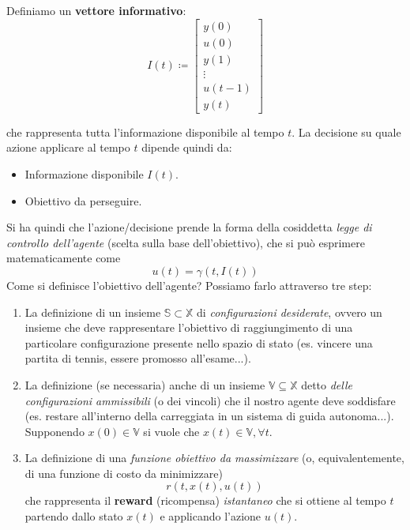 Definiamo un \textbf{vettore informativo}: 
\begin{equation}
    I(t) \coloneqq \begin{bmatrix}
y(0) \\
u(0) \\
y(1) \\
\vdots \\
u(t-1) \\
y(t)
\end{bmatrix}
\end{equation}

che rappresenta tutta l'informazione disponibile al tempo $t$. 
La decisione su quale azione applicare al tempo $t$ dipende quindi da:
\begin{itemize}
    \item Informazione disponibile $I(t)$.
    \item Obiettivo da perseguire.
\end{itemize} 
Si ha quindi che l'azione/decisione prende la forma della cosiddetta \textit{legge di controllo dell'agente} (scelta sulla base dell'obiettivo), che si pu\`o esprimere matematicamente come
\begin{equation}
u(t) = \gamma(t, I(t))
\end{equation}
Come si definisce l'obiettivo dell'agente? Possiamo farlo attraverso tre step:
\begin{enumerate}
\item La definizione di un insieme $\mathbb{S} \subset \mathbb{X}$ di \textit{configurazioni desiderate}, ovvero un insieme che deve rappresentare l'obiettivo di raggiungimento di una particolare configurazione presente nello spazio di stato (es. vincere una partita di tennis, essere promosso all'esame...). 

\item La definizione (se necessaria) anche di un insieme $\mathbb{V} \subseteq \mathbb{X}$ detto \textit{delle configurazioni ammissibili} (o dei vincoli) che il nostro agente deve soddisfare (es. restare all'interno della carreggiata in un sistema di guida autonoma...). Supponendo $x(0) \in \mathbb{V}$ si vuole che $x(t) \in \mathbb{V}, \forall t$.

\item La definizione di una \textit{funzione obiettivo da massimizzare} (o, equivalentemente, di una funzione di costo da minimizzare) 
   \begin{equation}
    r(t, x(t), u(t))
   \end{equation}
    che rappresenta il \textbf{reward} (ricompensa) \textit{istantaneo} che si ottiene al tempo $t$ partendo dallo stato $x(t)$ e applicando l'azione $u(t)$.
\end{enumerate}
